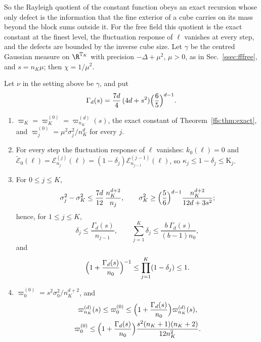 So the Rayleigh quotient of the constant function obeys an exact recursion
whose only defect is the information that the fine exterior of a cube
carries on its mass beyond the block sums outside it. For the free field
this quotient is the exact constant at the finest level, the fluctuation
response of $\ell$ vanishes at every step, and the defects are bounded by
the inverse cube size. Let $\gamma$ be the centred Gaussian measure on
$\R^{\mathbb T_K}$ with precision $-\Delta+\mu^2$, $\mu>0$, as in
Sec.~\ref{ssec:fffree}, and $s=n_K\mu$; then $\chi=1/\mu^2$.

\begin{proposition}\label{rR6:gauss}
Let $\nu$ in the setting above be $\gamma$, and put
\[
\Gamma_d(s)=\frac{7d}4\,(4d+s^2)\Bigl(\frac65\Bigr)^{d-1}.
\]
\begin{enumerate}[label=\textup{(\roman*)},leftmargin=*]
\item $\varpi_K=\varpi^{(0)}_K=\varpi^{(d)}_{n_K}(s)$, the exact constant of
Theorem~\textup{\ref{ffs:thm:exact}}, and $\varpi^{(0)}_j=\mu^2\sigma_j^2/
n_K^d$ for every $j$.
\item For every step the fluctuation response of $\ell$ vanishes: $k_0(\ell)
=0$ and $\tilde{\mathcal E}_0(\ell)=\mathcal E^{(j)}_{n_j}(\ell)=(1-\delta_j)
\mathcal E^{(j-1)}_{n_{j-1}}(\ell)$, so $\kappa_j\le1-\delta_j\le\mathrm K_j$.
\item For $0\le j\le K$,
\[
\sigma_j^2-\sigma_K^2\le\frac{7d}{12}\,\frac{n_K^{d+2}}{n_j},\qquad\sigma_K^2
\ge\Bigl(\frac56\Bigr)^{d-1}\frac{n_K^{d+2}}{12d+3s^2};
\]
hence, for $1\le j\le K$,
\[
\delta_j\le\frac{\Gamma_d(s)}{n_{j-1}},\qquad\sum_{j=1}^K\delta_j\le
\frac{b\,\Gamma_d(s)}{(b-1)n_0},
\]
and
\[
\Bigl(1+\frac{\Gamma_d(s)}{n_0}\Bigr)^{-1}\le\prod_{j=1}^K(1-\delta_j)\le1 .
\]
\item $\varpi^{(0)}_0=s^2\sigma_0^2/n_K^{d+2}$, and
\begin{gather*}
\varpi^{(d)}_{n_K}(s)\le\varpi^{(0)}_0\le\Bigl(1+\frac{\Gamma_d(s)}{n_0}
\Bigr)\varpi^{(d)}_{n_K}(s),\\
\varpi^{(0)}_0\le\Bigl(1+\frac{\Gamma_d(s)}{n_0}\Bigr)\frac{s^2(n_K+1)
(n_K+2)}{12n_K^2}.
\end{gather*}
\end{enumerate}
\end{proposition}

